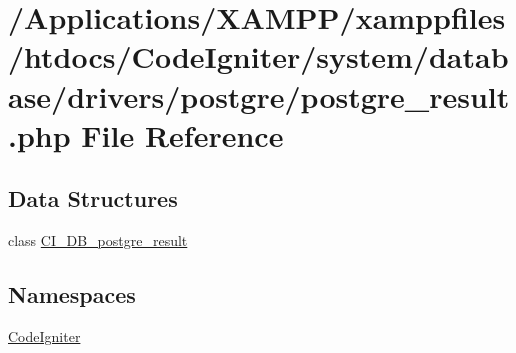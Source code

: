 \hypertarget{postgre__result_8php}{}\section{/\+Applications/\+X\+A\+M\+P\+P/xamppfiles/htdocs/\+Code\+Igniter/system/database/drivers/postgre/postgre\+\_\+result.php File Reference}
\label{postgre__result_8php}
\subsection*{Data Structures}
\begin{DoxyCompactItemize}
\item 
class \mbox{\hyperlink{class_c_i___d_b__postgre__result}{C\+I\+\_\+\+D\+B\+\_\+postgre\+\_\+result}}
\end{DoxyCompactItemize}
\subsection*{Namespaces}
\begin{DoxyCompactItemize}
\item 
 \mbox{\hyperlink{namespace_code_igniter}{Code\+Igniter}}
\end{DoxyCompactItemize}
